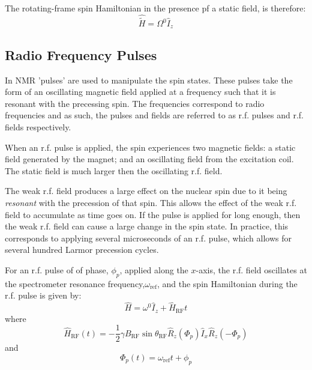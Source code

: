 The rotating-frame spin Hamiltonian in the presence pf a static field, is therefore:
\begin{equation}
  \hat{\tilde{H}} = \Omega^0\hat{I}_z
\end{equation}

\subsection{Radio Frequency Pulses}

In NMR 'pulses' are used to manipulate the spin states. These pulses take the form
of an oscillating magnetic field applied at a frequency such that it is resonant with
the precessing spin. The frequencies correspond to radio frequencies and as such, the pulses and
fields are referred to as r.f. pulses and r.f. fields respectively.

When an r.f. pulse is applied, the spin experiences two magnetic fields: a static field generated
by the magnet; and an oscillating field from the excitation coil. The static field is much larger
then the oscillating r.f. field.

The weak r.f. field produces a large effect on the nuclear spin due to it being \textit{resonant}
with the precession of that spin. This allows the effect of the weak r.f. field to accumulate
as time goes on. If the pulse is applied for long enough, then the weak r.f. field can cause a
large change in the spin state. In practice, this corresponds to applying several microseconds
of an r.f. pulse, which allows for several hundred Larmor precession cycles.

For an r.f. pulse of of phase, $\phi_p$, applied along the $x$-axis, the r.f. field oscillates at the spectrometer resonance frequency,$\omega_{\text{ref}}$, and  the spin Hamiltonian
during the r.f. pulse is given by:
\begin{equation}
  \hat{H} = \omega^0\hat{I}_z + \hat{H}_{\text{RF}}{t}
\end{equation}
where
\begin{equation}
  \hat{H}_{\text{RF}}(t) = -\frac{1}{2}\gamma{B_{\text{RF}}}\sin{\theta_{\text{RF}}}\hat{R}_z(\Phi_p)\hat{I}_x\hat{R}_z(-\Phi_p)
\end{equation}
and
\begin{equation}
  \Phi_p(t) = \omega_{\text{ref}}t + \phi_p
\end{equation}

